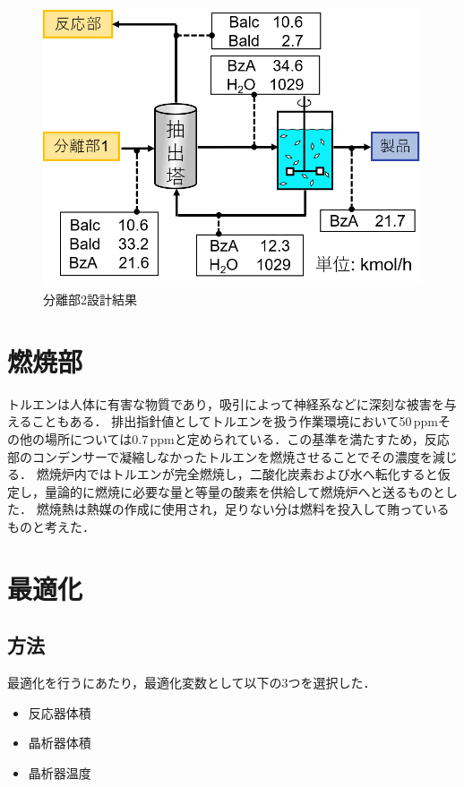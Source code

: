 \documentclass[a4j]{jsreport}
\begin{document}
\begin{figure}[htbp]
  \centering
  \includegraphics[scale=0.7]{Separion2Conclusion.png}
  \caption{分離部2設計結果}
  \label{分離部2設計結果}
\end{figure}


\clearpage
\chapter{燃焼部}
トルエンは人体に有害な物質であり，吸引によって神経系などに深刻な被害を与えることもある．
排出指針値としてトルエンを扱う作業環境において50\,ppmその他の場所については0.7\,ppmと定められている\cite{トルエン排出基準}．この基準を満たすため，反応部のコンデンサーで凝縮しなかったトルエンを燃焼させることでその濃度を減じる．
燃焼炉内ではトルエンが完全燃焼し，二酸化炭素および水へ転化すると仮定し，量論的に燃焼に必要な量と等量の酸素を供給して燃焼炉へと送るものとした．
燃焼熱は熱媒の作成に使用され，足りない分は燃料を投入して賄っているものと考えた．

\clearpage
\chapter{最適化}
\section{方法}
最適化を行うにあたり，最適化変数として以下の3つを選択した．
\begin{itemize}
  \item 反応器体積
  \item 晶析器体積
  \item 晶析器温度
\end{itemize}
\end{document}

